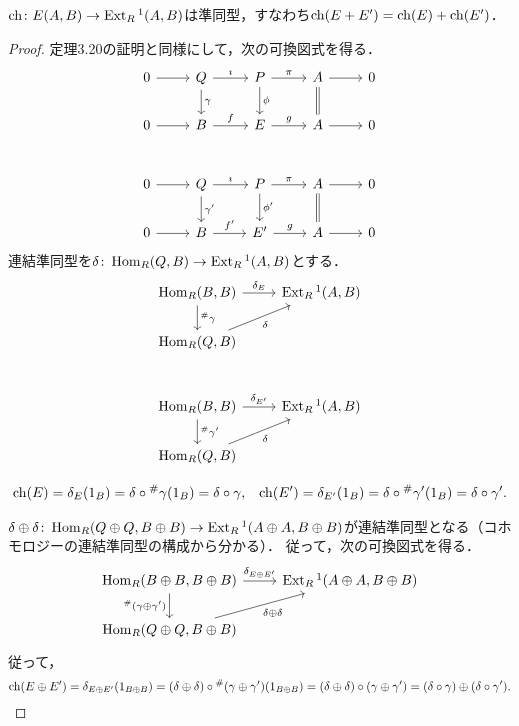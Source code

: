 \begin{screen}
  $\operatorname{ch} \colon E(A, B) \to \operatorname{Ext}_R{}^1 (A, B)$は準同型，すなわち$\operatorname{ch} (E+E') = \operatorname{ch}(E) + \operatorname{ch}(E')$．
\end{screen}
\begin{proof}
  定理3.20の証明と同様にして，次の可換図式を得る．
  \[
  \begin{tikzcd}
    0 \arrow[r] & Q \arrow[r, "\imath"]\arrow[d, "\gamma"] & P \arrow[r, "\pi"]\arrow[d, "\phi"] & A \arrow[r]\arrow[d, equal] & 0 \\
    0 \arrow[r] & B \arrow[r, "f"] & E \arrow[r, "g"] & A \arrow[r] & 0 \\[10pt]
    0 \arrow[r] & Q \arrow[r, "\imath"]\arrow[d, "\gamma'"] & P \arrow[r, "\pi"]\arrow[d, "\phi'"] & A \arrow[r]\arrow[d, equal] & 0 \\
    0 \arrow[r] & B \arrow[r, "f'"] & E' \arrow[r, "g"] & A \arrow[r] & 0
  \end{tikzcd}
  \]
  連結準同型を$\delta \colon \operatorname{Hom}_R(Q, B) \to \operatorname{Ext}_R{}^1(A, B)$とする．
  \[
  \begin{tikzcd}
    \Hom_R(B, B) \arrow[r, "\delta_E"]\arrow[d, "{}^\#\gamma"] & \Ext_R{}^1(A, B) \\
    \Hom_R(Q, B) \arrow[ru, "\delta"'] \\[10pt]
    \Hom_R(B, B) \arrow[r, "\delta_{E'}"]\arrow[d, "{}^\#\gamma'"] & \Ext_R{}^1(A, B) \\
    \Hom_R(Q, B) \arrow[ru, "\delta"']
  \end{tikzcd}
  \]

  \begin{align*}
    \operatorname{ch}(E) = \delta_E(1_B) = \delta \circ {}^\#\gamma (1_B) = \delta \circ \gamma & , & \operatorname{ch}(E') = \delta_{E'}(1_B) = \delta \circ {}^\#\gamma' (1_B) = \delta \circ \gamma' .
  \end{align*}

  $\delta \oplus \delta \colon \operatorname{Hom}_R(Q \oplus Q, B \oplus B) \to \operatorname{Ext}_R{}^1(A \oplus A, B \oplus B)$が連結準同型となる（コホモロジーの連結準同型の構成から分かる）．
  従って，次の可換図式を得る．
  \[
  \begin{tikzcd}
    \Hom_R(B \oplus B, B \oplus B) \arrow[r, "\delta_{E \oplus E'}"]\arrow[d, "{}^\#(\gamma \oplus \gamma')"'] & \Ext_R{}^1(A \oplus A, B \oplus B) \\
    \Hom_R(Q \oplus Q, B \oplus B) \arrow[ru, "\delta \oplus \delta"']
  \end{tikzcd}
  \]
  従って，
  \[
  \operatorname{ch} (E \oplus E') = \delta_{E \oplus E'}(1_{B \oplus B}) = (\delta \oplus \delta) \circ {}^\#(\gamma \oplus \gamma') (1_{B \oplus B})
  = (\delta \oplus \delta) \circ (\gamma \oplus \gamma') = (\delta \circ \gamma) \oplus (\delta \circ \gamma') .
  \]


\end{proof}
